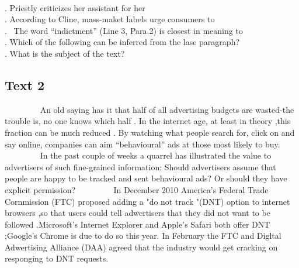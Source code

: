     
    \begin{questions} . Priestly criticizes her assistant for her
    \\ . According to Cline, mass-maket labels urge consumers to
    \\ .  The word “indictment” (Line 3, Para.2) is closest in meaning to
    \\ . Which of the following can be inferred from the lase paragraph?
    \\ . What is the subject of the text?
    \\ \end{questions}      \subsection{Text 2}
    
    An old saying has it that half of all advertising budgets are wasted-the trouble is, no one knows which half . In the internet age, at least in theory ,this fraction can be much reduced . By watching what people search for, click on and say online, companies can aim “behavioural” ads at those most likely to buy.
    
    In the past couple of weeks a quarrel has illustrated the value to advertisers of such fine-grained information: Should advertisers assume that people are happy to be tracked and sent behavioural ads? Or should they have explicit permission?
    
    In December 2010 America's Federal Trade Cornmission (FTC) proposed adding a "do not track "(DNT) option to internet browsers ,so that users could tell adwertisers that they did not want to be followed .Microsoft's Internet Explorer and Apple's Safari both offer DNT ;Google's Chrome is due to do so this year. In February the FTC and Digltal Adwertising Alliance (DAA) agreed that the industry would get cracking on responging to DNT requests.
